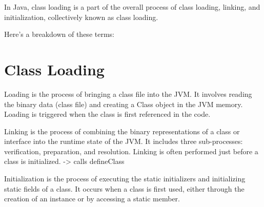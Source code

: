 In Java, class loading is a part of the overall process of class loading, linking, and initialization, collectively known as class loading.

Here's a breakdown of these terms:

\section{Class Loading}

Loading is the process of bringing a class file into the JVM.
It involves reading the binary data (class file) and creating a Class object in the JVM memory.
Loading is triggered when the class is first referenced in the code.

Linking is the process of combining the binary representations of a class or interface into the runtime state of the JVM.
It includes three sub-processes: verification, preparation, and resolution.
Linking is often performed just before a class is initialized. -> calls defineClass

Initialization is the process of executing the static initializers and initializing static fields of a class.
It occurs when a class is first used, either through the creation of an instance or by accessing a static member.

